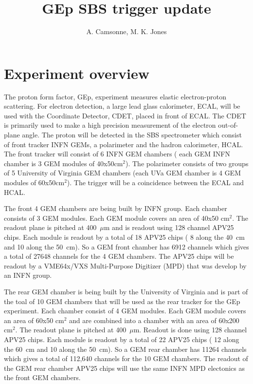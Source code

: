 \documentclass{article}
\title{GEp SBS trigger update}
\author{A. Camsonne, M. K. Jones}
\begin{document}
\maketitle
\section{Experiment overview}
The proton form factor, GEp, experiment measures elastic electron-proton scattering. For electron
detection, a large lead glass calorimeter, ECAL,  will be used with the Coordinate Detector, CDET, placed in front
of ECAL.  The CDET is primarily used
to make a high precision measurement of the electron out-of-plane angle. The proton will be
detected in the SBS spectrometer which consist of front tracker INFN GEMs, a polarimeter and the hadron calorimeter, HCAL.
The front tracker will consist of 6 INFN GEM chambers ( each GEM INFN chamber is 3 GEM modules of 40x50cm$^2$).
The polarimeter consists of two groups of 5 University of Virginia GEM chambers (each UVa GEM chamber
is 4 GEM modules of 60x50cm$^2$). The trigger will be a coincidence between the ECAL and HCAL.

The front 4 GEM chambers are being built by INFN group. Each chamber consists
of 3 GEM modules. Each GEM module covers an area of 40x50 cm$^2$. The readout plane is pitched at 400~$\mu$m
and is readout using 128 channel APV25 chips. Each module is readout by a total of 18 APV25 chips ( 8 along
the 40~cm and 10 along the 50~cm). So a GEM front chamber has 6912 channels which gives a total of 27648 channels
for the 4 GEM chambers. The APV25 chips will be readout by a VME64x/VXS Multi-Purpose Digitizer (MPD) that was
develop by an INFN group.

The rear GEM chamber is being built by the University of Virginia and is part of the toal of 10 GEM chambers
that will be used as the rear tracker for the GEp experiment. Each chamber consist of 4 GEM modules.
Each GEM module covers an area of 60x50 cm$^2$ and are combined into a chamber with an area
of 60x200 cm$^2$. The readout plane is pitched at 400~$\mu$m.
 Readout is done using 128 channel APV25 chips. Each module is readout 
by a total of  22 APV25 chips (  12 along the 60~cm and 10 along the 50~cm). So a GEM rear chamber has  
11264 channels which gives a total of 112,640 channels for the 10 GEM chambers. The readout of the GEM
rear chamber APV25 chips will use the same INFN MPD electonics as the front GEM chambers. 
\end{document}
